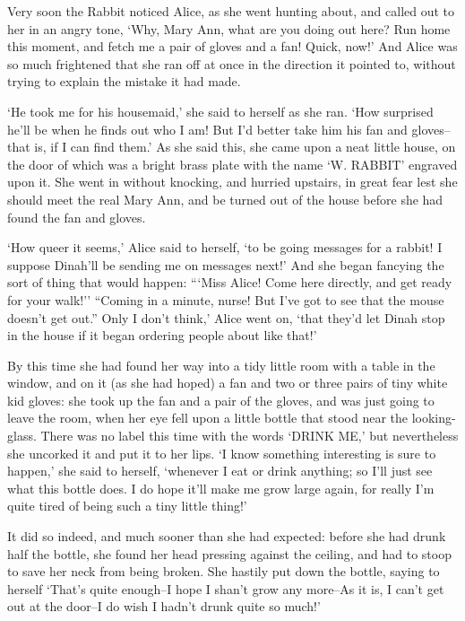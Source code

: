 \documentclass[statementpaper,twoside,openany]{memoir}
\begin{document}
Very soon the Rabbit noticed Alice, as she went hunting about, and called out to her in an angry tone, `Why, Mary Ann, what are you doing out here? Run home this moment, and fetch me a pair of gloves and a fan! Quick, now!' And Alice was so much frightened that she ran off at once in the direction it pointed to, without trying to explain the mistake it had made.

`He took me for his housemaid,' she said to herself as she ran. `How surprised he'll be when he finds out who I am! But I'd better take him his fan and gloves--that is, if I can find them.' As she said this, she came upon a neat little house, on the door of which was a bright brass plate with the name `W. RABBIT' engraved upon it. She went in without knocking, and hurried upstairs, in great fear lest she should meet the real Mary Ann, and be turned out of the house before she had found the fan and gloves.

`How queer it seems,' Alice said to herself, `to be going messages for a rabbit! I suppose Dinah'll be sending me on messages next!' And she began fancying the sort of thing that would happen: ```Miss Alice! Come here directly, and get ready for your walk!'' ``Coming in a minute, nurse! But I've got to see that the mouse doesn't get out.'' Only I don't think,' Alice went on, `that they'd let Dinah stop in the house if it began ordering people about like that!'

By this time she had found her way into a tidy little room with a table in the window, and on it (as she had hoped) a fan and two or three pairs of tiny white kid gloves: she took up the fan and a pair of the gloves, and was just going to leave the room, when her eye fell upon a little bottle that stood near the looking-glass. There was no label this time with the words `DRINK ME,' but nevertheless she uncorked it and put it to her lips. `I know something interesting is sure to happen,' she said to herself, `whenever I eat or drink anything; so I'll just see what this bottle does. I do hope it'll make me grow large again, for really I'm quite tired of being such a tiny little thing!'

It did so indeed, and much sooner than she had expected: before she had drunk half the bottle, she found her head pressing against the ceiling, and had to stoop to save her neck from being broken. She hastily put down the bottle, saying to herself `That's quite enough--I hope I shan't grow any more--As it is, I can't get out at the door--I do wish I hadn't drunk quite so much!'
\end{document}
